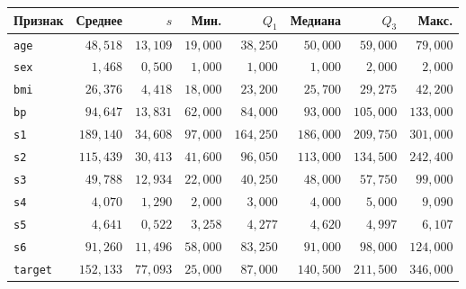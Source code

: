 \begin{tabular}{lrrrrrrr}
\toprule
Признак & Среднее & $s$ & Мин. & $Q_1$ & Медиана & $Q_3$ & Макс. \\
\midrule
\texttt{age} & $48{,}518$ & $13{,}109$ & $19{,}000$ & $38{,}250$ & $50{,}000$ & $59{,}000$ & $79{,}000$ \\
\texttt{sex} & $1{,}468$ & $0{,}500$ & $1{,}000$ & $1{,}000$ & $1{,}000$ & $2{,}000$ & $2{,}000$ \\
\texttt{bmi} & $26{,}376$ & $4{,}418$ & $18{,}000$ & $23{,}200$ & $25{,}700$ & $29{,}275$ & $42{,}200$ \\
\texttt{bp} & $94{,}647$ & $13{,}831$ & $62{,}000$ & $84{,}000$ & $93{,}000$ & $105{,}000$ & $133{,}000$ \\
\texttt{s1} & $189{,}140$ & $34{,}608$ & $97{,}000$ & $164{,}250$ & $186{,}000$ & $209{,}750$ & $301{,}000$ \\
\texttt{s2} & $115{,}439$ & $30{,}413$ & $41{,}600$ & $96{,}050$ & $113{,}000$ & $134{,}500$ & $242{,}400$ \\
\texttt{s3} & $49{,}788$ & $12{,}934$ & $22{,}000$ & $40{,}250$ & $48{,}000$ & $57{,}750$ & $99{,}000$ \\
\texttt{s4} & $4{,}070$ & $1{,}290$ & $2{,}000$ & $3{,}000$ & $4{,}000$ & $5{,}000$ & $9{,}090$ \\
\texttt{s5} & $4{,}641$ & $0{,}522$ & $3{,}258$ & $4{,}277$ & $4{,}620$ & $4{,}997$ & $6{,}107$ \\
\texttt{s6} & $91{,}260$ & $11{,}496$ & $58{,}000$ & $83{,}250$ & $91{,}000$ & $98{,}000$ & $124{,}000$ \\
\texttt{target} & $152{,}133$ & $77{,}093$ & $25{,}000$ & $87{,}000$ & $140{,}500$ & $211{,}500$ & $346{,}000$ \\
\bottomrule
\end{tabular}
